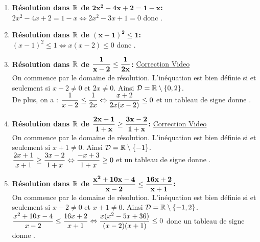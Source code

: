\documentclass[a4paper, 11pt]{article}
\begin{document}
\begin{correction}
\begin{enumerate}
\item \textbf{R\'esolution dans $\mathbf{\mathbb{R}}$ de $\mathbf{2x^2-4x+2=1-x}$:}\\
\noindent $2x^2-4x+2=1-x\Leftrightarrow 2x^2-3x+1=0$ donc .
\item \textbf{R\'esolution dans $\mathbf{\mathbb{R}}$ de $\mathbf{(x-1)^2\leq 1}$:}\\
\noindent $(x-1)^2\leq 1\Leftrightarrow x(x-2)\leq 0$ donc .
\item \textbf{R\'esolution dans $\mathbf{\mathbb{R}}$ de $\mathbf{\displaystyle\frac{1}{x-2}\leq \displaystyle\frac{1}{2x}}$:} \href{https://youtu.be/8u3_PYb3xXY}{Correction Video}\\
\noindent On commence par le domaine de r\'esolution. L'in\'equation est bien d\'efinie si et seulement si $x-2\not= 0$ et $2x \not= 0$. Ainsi $\mathcal{D}=\mathbb{R}\setminus\left\lbrace 0,2 \right\rbrace$.\\
\noindent De plus, on a : $\displaystyle\frac{1}{x-2}\leq \displaystyle\frac{1}{2x}\Leftrightarrow \displaystyle\frac{x+2}{2x(x-2)}\leq 0$ et un tableau de signe donne 
.
\item \textbf{R\'esolution dans $\mathbf{\mathbb{R}}$ de $\mathbf{\displaystyle\frac{2x+1}{1+x}\geq \displaystyle\frac{3x-2}{1+x}}$:} \href{https://youtu.be/bwQSb9Lfozo}{Correction Video}\\
\noindent On commence par le domaine de r\'esolution. L'in\'equation est bien d\'efinie si et seulement si $x+1\not= 0$. Ainsi $\mathcal{D}=\mathbb{R}\setminus\left\lbrace -1 \right\rbrace$.\\
\noindent $\displaystyle\frac{2x+1}{x+1}\geq \displaystyle\frac{3x-2}{1+x}\Leftrightarrow \displaystyle\frac{-x+3}{1+x}\geq 0$ et un tableau de signe donne 
.
\item \textbf{R\'esolution dans $\mathbf{\mathbb{R}}$ de $\mathbf{\displaystyle\frac{x^2+10x-4}{x-2}\leq \displaystyle\frac{16x+2}{x+1}}$:}\\
\noindent On commence par le domaine de r\'esolution. L'in\'equation est bien d\'efinie si et seulement si $x-2\not= 0$ et $x+1 \not= 0$. Ainsi $\mathcal{D}=\mathbb{R}\setminus\left\lbrace -1,2 \right\rbrace$.\\
\noindent $\displaystyle\frac{x^2+10x-4}{x-2}\leq \displaystyle\frac{16x+2}{x+1}\Leftrightarrow \displaystyle\frac{x(x^2-5x+36)}{(x-2)(x+1)}\leq 0$ donc un tableau de signe donne .
\end{enumerate}
\end{correction}
\end{document}

